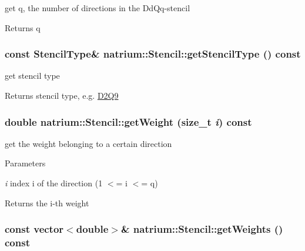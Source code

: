 get q, the number of directions in the DdQq-\/stencil \begin{DoxyReturn}{Returns}
q 
\end{DoxyReturn}
\hypertarget{classnatrium_1_1Stencil_af4dbee6d83d5d749f02f771633d54db2}{
\subsubsection[{getStencilType}]{\setlength{\rightskip}{0pt plus 5cm}const {\bf StencilType}\& natrium::Stencil::getStencilType () const}}
\label{classnatrium_1_1Stencil_af4dbee6d83d5d749f02f771633d54db2}


get stencil type \begin{DoxyReturn}{Returns}
stencil type, e.g. \hyperlink{classnatrium_1_1D2Q9}{D2Q9} 
\end{DoxyReturn}
\hypertarget{classnatrium_1_1Stencil_ae5cb8bd1a305ed29c779725f489bb855}{
\subsubsection[{getWeight}]{\setlength{\rightskip}{0pt plus 5cm}double natrium::Stencil::getWeight (size\_\-t {\em i}) const}}
\label{classnatrium_1_1Stencil_ae5cb8bd1a305ed29c779725f489bb855}


get the weight belonging to a certain direction 
\begin{DoxyParams}{Parameters}
\item[{\em i}]index i of the direction (1 $<$= i $<$= q) \end{DoxyParams}
\begin{DoxyReturn}{Returns}
the i-\/th weight 
\end{DoxyReturn}
\hypertarget{classnatrium_1_1Stencil_a35c26427afdd33c3477b60be157e5bc8}{
\subsubsection[{getWeights}]{\setlength{\rightskip}{0pt plus 5cm}const vector$<$double$>$\& natrium::Stencil::getWeights () const}}
\label{classnatrium_1_1Stencil_a35c26427afdd33c3477b60be157e5bc8}


